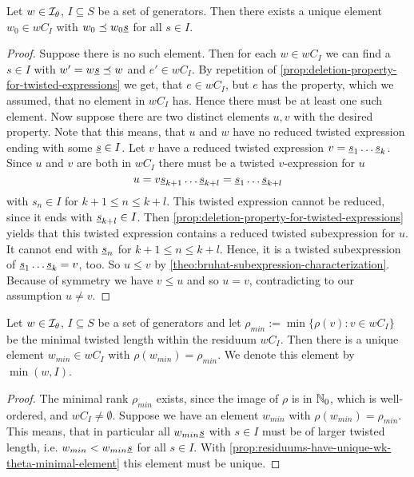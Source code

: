 \begin{prop}
	Let $w \in \mathcal{I}_{\theta}$, $I \subseteq S$ be a set of generators. Then there exists a unique element $w_0 \in wC_I$ with $w_0 \preceq w_0 \underline{s}$ for all $s \in I$.

	\begin{proof}
		Suppose there is no such element. Then for each $w \in wC_I$ we can find a $s \in I$ with $w' = w \underline{s} \preceq w$ and $e' \in wC_I$. By repetition of \ref{prop:deletion-property-for-twisted-expressions} we get, that $e \in wC_I$, but $e$ has the property, which we assumed, that no element in $wC_I$ has. Hence there must be at least one such element. Now suppose there are two distinct elements $u,v$ with the desired property. Note that this means, that $u$ and $w$ have no reduced twisted expression ending with some $\underline{s} \in I$. Let $v$ have a reduced twisted expression $v = \underline{s}_1 \ldots \underline{s}_k$. Since $u$ and $v$ are both in $wC_I$ there must be a twisted $v$-expression for $u$
		$$ u = v \underline{s}_{k+1} \ldots \underline{s}_{k+l} = \underline{s}_1 \ldots \underline{s}_{k+l} $$
		with $s_n \in I$ for $k+1 \leq n \leq k+l$. This twisted expression cannot be reduced, since it ends with $\underline{s}_{k+l} \in I$. Then \ref{prop:deletion-property-for-twisted-expressions} yields that this twisted expression contains a reduced twisted subexpression for $u$. It cannot end with $\underline{s}_n$ for $k+1 \leq n \leq k+l$. Hence, it is a twisted subexpression of $\underline{s}_1 \ldots \underline{s}_k = v$, too. So $u \leq v$ by \ref{theo:bruhat-subexpression-characterization}. Because of symmetry we have $v \leq u$ and so $u = v$, contradicting to our assumption $u \neq v$.
	\end{proof}
\end{prop}

\begin{coro}
	Let $w \in \mathcal{I}_{\theta}$, $I \subseteq S$ be a set of generators and let $\rho_{min} := \min \{ \rho(v) : v \in wC_I \}$ be the minimal twisted length within the residuum $wC_I$. Then there is a unique element $w_{min} \in wC_I$ with $\rho(w_{min}) = \rho_{min}$. We denote this element by $\min(w,I)$.

	\begin{proof}
		The minimal rank $\rho_{min}$ exists, since the image of $\rho$ is in $\mathbb{N}_0$, which is well-ordered, and $wC_I \neq \emptyset$. Suppose we have an element $w_{min}$ with $\rho(w_{min}) = \rho_{min}$. This means, that in particular all $w_{min} \underline{s}$ with $s \in I$ must be of larger twisted length, i.e. $w_{min} < w_{min} \underline{s}$ for all $s \in I$. With \ref{prop:residuums-have-unique-wk-theta-minimal-element} this element must be unique.
	\end{proof}
\end{coro}

